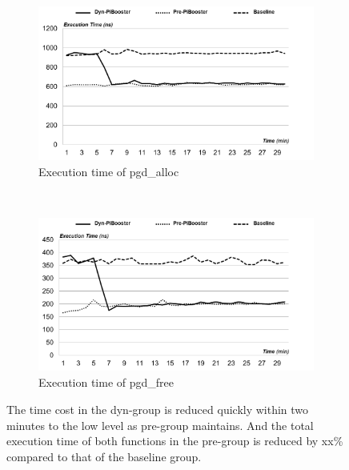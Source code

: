 \begin{figure}[t!]
    \centering
    \begin{subfigure}[t]{0.5\textwidth}
        \centering
        \includegraphics[height=2.0in]{image/micro/PGDalloc.png}
        \caption{Execution time of pgd\_alloc}
        \label{fig:subfig:a}
    \end{subfigure}%
    ~
    \begin{subfigure}[t]{0.5\textwidth}
        \centering
        \includegraphics[height=2.0in]{image/micro/PGDfree.png}
        \caption{Execution time of pgd\_free}
        \label{fig:subfig:b}
    \end{subfigure}
    \caption{The time cost in the dyn-\name group is reduced quickly within two minutes to the low level as pre-\name group maintains. And the total execution time of both functions in the pre-\name group is reduced by xx\% compared to that of the baseline group.}
    \label{fig:PGDtime}
\end{figure}

